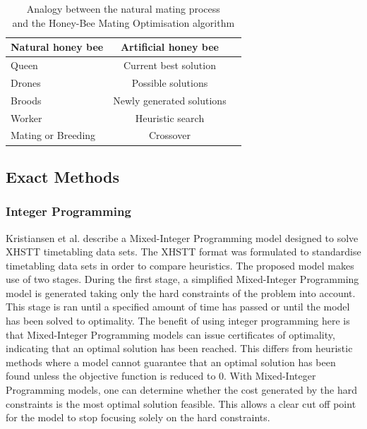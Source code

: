 \begin{table}[H]
	\caption{Analogy between the natural mating process\\ and the Honey-Bee Mating Optimisation algorithm}
	\label{tab:hbmo}
	\centering
	\begin{tabular}{l c c }
		\hline
		\textbf{Natural honey bee}  & \textbf{Artificial honey bee} \\ \hline
		Queen & Current best solution \\
		Drones & Possible solutions \\
	    Broods & Newly generated solutions \\
            Worker & Heuristic search \\
            Mating or Breeding & Crossover \\ \hline
	\end{tabular}
\end{table}


\subsection{Exact Methods}
\subsubsection{Integer Programming}

Kristiansen et al. \cite{kristiansen2015} describe a Mixed-Integer Programming model designed to solve XHSTT timetabling data sets. The XHSTT format was formulated to standardise timetabling data sets in order to compare heuristics. The proposed model makes use of two stages. During the first stage, a simplified Mixed-Integer Programming model is generated taking only the hard constraints of the problem into account. This stage is ran until a specified amount of time has passed or until the model has been solved to optimality. The benefit of using integer programming here is that Mixed-Integer Programming models can issue certificates of optimality, indicating that an optimal solution has been reached. This differs from heuristic methods where a model cannot guarantee that an optimal solution has been found unless the objective function is reduced to 0. With Mixed-Integer Programming models, one can determine whether the cost generated by the hard constraints is the most optimal solution feasible. This allows a clear cut off point for the model to stop focusing solely on the hard constraints. 

